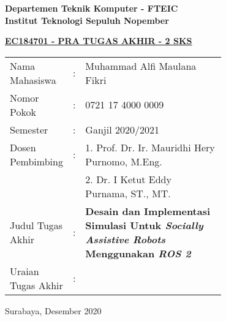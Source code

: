 \begin{flushleft}
  \textbf{Departemen Teknik Komputer - FTEIC}\\
  \textbf{Institut Teknologi Sepuluh Nopember}\\
\end{flushleft}

\begin{center}
  \underline{\textbf{EC184701 - PRA TUGAS AKHIR - 2 SKS}}
\end{center}

\begin{adjustwidth}{-0.2cm}{}
  \begin{tabular}{lcp{0.7\linewidth}}

    Nama Mahasiswa &:& Muhammad Alfi Maulana Fikri \\
    Nomor Pokok &:&	0721 17 4000 0009 \\

    Semester &:& Ganjil 2020/2021 \\

    Dosen Pembimbing &:& 1. Prof. Dr. Ir. Mauridhi Hery Purnomo, M.Eng. \\
    & & 2. Dr. I Ketut Eddy Purnama, ST., MT. \\

    Judul Tugas Akhir &:& \textbf{Desain dan Implementasi Simulasi Untuk \emph{Socially Assistive Robots} Menggunakan \emph{ROS 2}} \\

    Uraian Tugas Akhir &:& \\
  \end{tabular}
\end{adjustwidth}

\lipsum[1]
\vspace{1ex}

\begin{flushright}
  Surabaya, Desember 2020
\end{flushright}
\vspace{1ex}


